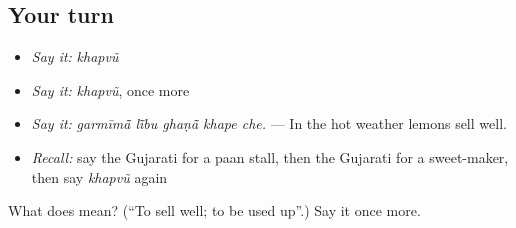 \subsection*{Your turn}
\begin{itemize}
\raggedright
  \item \emph{Say it:} \emph{khapvũ}
  \item \emph{Say it:} \emph{khapvũ}, once more
  \item \emph{Say it:} \emph{garmīmā̃ lī̃bu ghaṇā̃ khape che.} — In the hot weather lemons sell well.
  \item \emph{Recall:} say the Gujarati for a paan stall, then the Gujarati for a sweet-maker, then say \emph{khapvũ} again
\end{itemize}

\begin{tcolorbox}[breakable,colback=teal!4,colframe=teal!35!black,title={Before you move on}]
What does  mean? (\textquotedblleft{}To sell well; to be used up\textquotedblright{}.) Say it once more.
\end{tcolorbox}
